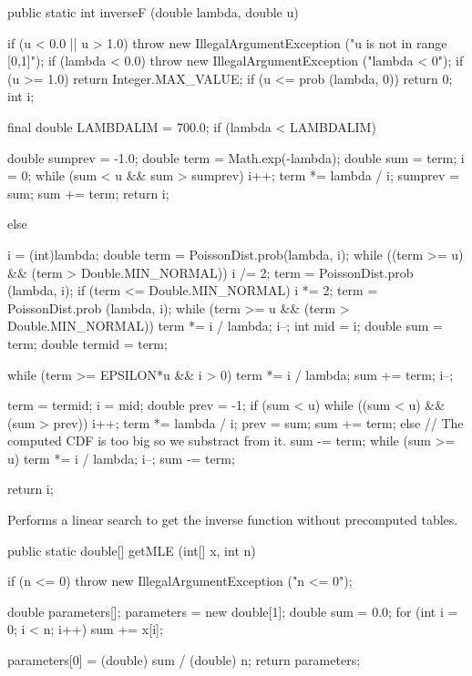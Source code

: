 \begin{code}

   public static int inverseF (double lambda, double u)\begin{hide} {
      if (u < 0.0 || u > 1.0)
         throw new IllegalArgumentException ("u is not in range [0,1]");
      if (lambda < 0.0)
         throw new IllegalArgumentException ("lambda < 0");
      if (u >= 1.0)
         return Integer.MAX_VALUE;
      if (u <= prob (lambda, 0))
         return 0;
      int i;

      final double LAMBDALIM = 700.0;
      if (lambda < LAMBDALIM) {
         double sumprev = -1.0;
         double term = Math.exp(-lambda);
         double sum = term;
         i = 0;
         while (sum < u && sum > sumprev) {
            i++;
            term *= lambda / i;
            sumprev = sum;
            sum += term;
         }
         return i;

      } else {
         i = (int)lambda;
         double term = PoissonDist.prob(lambda, i);
         while ((term >= u) && (term > Double.MIN_NORMAL)) {
            i /= 2;
            term = PoissonDist.prob (lambda, i);
         }
         if (term <= Double.MIN_NORMAL) {
            i *= 2;
            term = PoissonDist.prob (lambda, i);
            while (term >= u && (term > Double.MIN_NORMAL)) {
               term *= i / lambda;
               i--;
            }
         }
         int mid = i;
         double sum = term;
         double termid = term;

         while (term >= EPSILON*u && i > 0) {
            term *= i / lambda;
            sum += term;
            i--;
         }

         term = termid;
         i = mid;
        double prev = -1;
        if (sum < u) {
            while ((sum < u) && (sum > prev)) {
               i++;
               term *= lambda / i;
               prev = sum;
               sum += term;
            }
         } else {
            // The computed CDF is too big so we substract from it.
            sum -= term;
            while (sum >= u) {
               term *= i / lambda;
               i--;
               sum -= term;
            }
         }
      }
      return i;
   }\end{hide}
\end{code}
\begin{tabb} Performs a linear search to get the inverse function without
   precomputed tables.
\end{tabb}
\begin{code}

   public static double[] getMLE (int[] x, int n)\begin{hide} {
      if (n <= 0)
         throw new IllegalArgumentException ("n <= 0");

      double parameters[];
      parameters = new double[1];
      double sum = 0.0;
      for (int i = 0; i < n; i++) {
         sum += x[i];
      }

      parameters[0] = (double) sum / (double) n;
      return parameters;
   }\end{hide}
\end{code}
